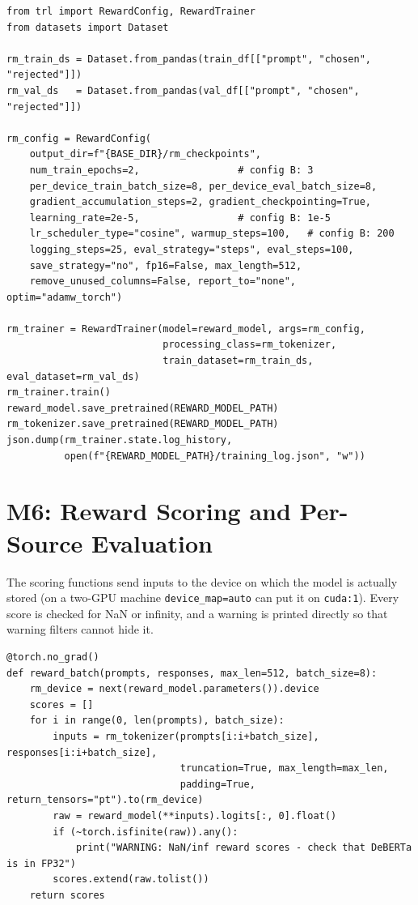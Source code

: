 \begin{lstlisting}[caption={Reward-model training with TRL (configuration A).}, label={lst:rmtrain}]
from trl import RewardConfig, RewardTrainer
from datasets import Dataset

rm_train_ds = Dataset.from_pandas(train_df[["prompt", "chosen", "rejected"]])
rm_val_ds   = Dataset.from_pandas(val_df[["prompt", "chosen", "rejected"]])

rm_config = RewardConfig(
    output_dir=f"{BASE_DIR}/rm_checkpoints",
    num_train_epochs=2,                 # config B: 3
    per_device_train_batch_size=8, per_device_eval_batch_size=8,
    gradient_accumulation_steps=2, gradient_checkpointing=True,
    learning_rate=2e-5,                 # config B: 1e-5
    lr_scheduler_type="cosine", warmup_steps=100,   # config B: 200
    logging_steps=25, eval_strategy="steps", eval_steps=100,
    save_strategy="no", fp16=False, max_length=512,
    remove_unused_columns=False, report_to="none", optim="adamw_torch")

rm_trainer = RewardTrainer(model=reward_model, args=rm_config,
                           processing_class=rm_tokenizer,
                           train_dataset=rm_train_ds, eval_dataset=rm_val_ds)
rm_trainer.train()
reward_model.save_pretrained(REWARD_MODEL_PATH)
rm_tokenizer.save_pretrained(REWARD_MODEL_PATH)
json.dump(rm_trainer.state.log_history,
          open(f"{REWARD_MODEL_PATH}/training_log.json", "w"))
\end{lstlisting}

\section{M6: Reward Scoring and Per-Source Evaluation}
\label{sec:m6}

The scoring functions send inputs to the device on which the model is actually stored (on a two-GPU machine \texttt{device\_map=\textquotedbl{}auto\textquotedbl{}} can put it on \texttt{cuda:1}). Every score is checked for NaN or infinity, and a warning is printed directly so that warning filters cannot hide it.

\begin{lstlisting}[caption={Batched reward scoring with device-safe placement and NaN guards.}, label={lst:score}]
@torch.no_grad()
def reward_batch(prompts, responses, max_len=512, batch_size=8):
    rm_device = next(reward_model.parameters()).device
    scores = []
    for i in range(0, len(prompts), batch_size):
        inputs = rm_tokenizer(prompts[i:i+batch_size], responses[i:i+batch_size],
                              truncation=True, max_length=max_len,
                              padding=True, return_tensors="pt").to(rm_device)
        raw = reward_model(**inputs).logits[:, 0].float()
        if (~torch.isfinite(raw)).any():
            print("WARNING: NaN/inf reward scores - check that DeBERTa is in FP32")
        scores.extend(raw.tolist())
    return scores
\end{lstlisting}

